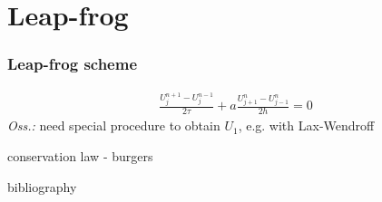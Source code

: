\documentclass{beamer}
\begin{document}
\section{Leap-frog}
\begin{frame}
\frametitle{Leap-frog scheme}
\begin{align*}
\frac{U_j^{n+1} - U_j^{n-1}}{2\tau} + a \frac{U_{j+1}^n-U_{j-1}^n}{2h} = 0
\end{align*}
\textit{Oss.:} need special procedure to obtain $U_1$, e.g. with Lax-Wendroff
\end{frame}
\begin{frame}
conservation law - burgers
\end{frame}
\begin{frame}
bibliography
\end{frame}
\end{document}
